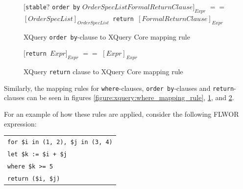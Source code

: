 \begin{figure}[!h]
\centering
$[$\texttt{stable}$?$ \texttt{order by} $OrderSpecList FormalReturnClause]_{Expr}$ \newline
$==$ \newline
$[OrderSpecList]_{OrderSpecList}$\texttt{ return }$[FormalReturnClause]_{Expr}$
  \caption{XQuery \texttt{order by}-clause to XQuery Core mapping rule}
  \label{figure:xquery:orderby_mapping_rule}
\end{figure}

\begin{figure}[!h]
\centering
$[$\texttt{return }$Expr]_{Expr}$ \newline
$==$ \newline
$[Expr]_{Expr}$
  \caption{XQuery \texttt{return} clause to XQuery Core mapping rule}
  \label{figure:xquery:return_mapping_rule}
\end{figure}

Similarly, the mapping rules for \texttt{where}-clauses, \texttt{order by}-clauses and
\texttt{return}-clauses can be seen in figures \ref{figure:xquery:where_mapping_rule},
\ref{figure:xquery:orderby_mapping_rule},
and \ref{figure:xquery:return_mapping_rule}.

For an example of how these rules are applied, consider the following FLWOR
expression:
%
\begin{center}
\begin{tabular}{l}
\texttt{for \$i in (1, 2), \$j in (3, 4)} \\
  \texttt{let \$k := \$i + \$j} \\
  \texttt{where \$k >= 5} \\
   \texttt{return (\$i, \$j)} \\
\end{tabular}
\end{center}

